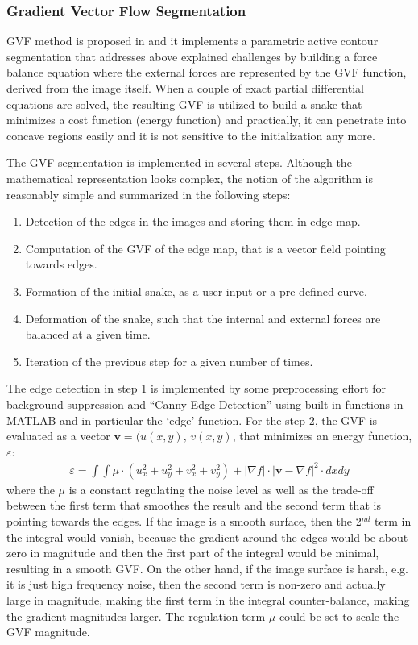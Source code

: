 \documentclass{article}
\begin{document}
\subsubsection*{Gradient Vector Flow Segmentation}


GVF method is proposed in \cite{gvf} and it implements a parametric active contour segmentation that addresses above explained challenges by building a force balance equation where the external forces are represented by the GVF function, derived from the image itself. When a couple of exact partial differential equations are solved, the resulting GVF is utilized to build a snake that minimizes a cost function (energy function) and practically, it can penetrate into concave regions easily and it is not sensitive to the initialization any more. 

The GVF segmentation is implemented in several steps. Although the mathematical representation looks complex, the notion of the algorithm is reasonably simple and summarized in the following steps:
\begin{enumerate}
\item Detection of the edges in the images and storing them in edge map.
\item Computation of the GVF of the edge map, that is a vector field pointing towards edges.
\item Formation of the initial snake, as a user input or a pre-defined curve.
\item Deformation of the snake, such that the internal and external forces are balanced at a given time.
\item Iteration of the previous step for a given number of times.
\end{enumerate}

The edge detection in step 1 is implemented by some preprocessing effort for background suppression and ``Canny Edge Detection'' using built-in functions in MATLAB and in particular the `edge' function. For the step 2, the GVF is evaluated as a vector $\mathbf{v}=(u(x,y),\, v(x,y)$, that minimizes an energy function, $\varepsilon$:
\begin{align*}
\varepsilon = \int \int \mu \cdot (u_x^2 +u_y^2+v_x^2+v_y^2)+|\nabla f|\cdot |\mathbf{v}-\nabla f|^2 \cdot dxdy
\end{align*}
where the $\mu$ is a constant regulating the noise level as well as the trade-off between the first term that smoothes the result and the second term that is pointing towards the edges. If the image is a smooth surface, then the 2$^{nd}$ term in the integral would vanish, because the gradient around the edges would be about zero in magnitude and then the first part of the integral would be minimal, resulting in a smooth GVF. On the other hand, if the image surface is harsh, e.g. it is just high frequency noise, then the second term is non-zero and actually large in magnitude, making the first term in the integral counter-balance, making the gradient magnitudes larger. The regulation term $\mu$ could be set to scale the GVF magnitude.
\end{document}
